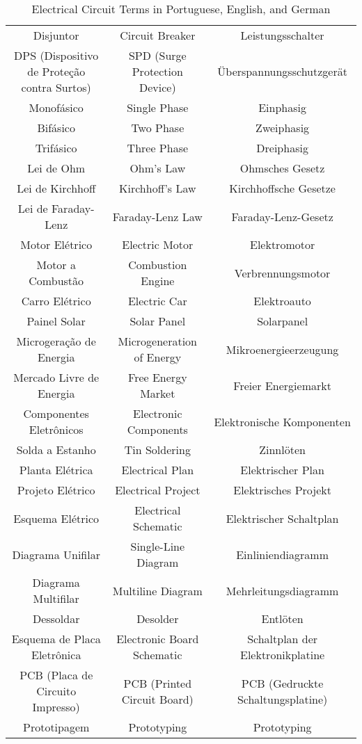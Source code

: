 \begin{table}[ht]
\begin{tabular}{|c|c|c|}
  Disjuntor & Circuit Breaker & Leistungsschalter \\
  DPS (Dispositivo de Proteção contra Surtos) & SPD (Surge Protection Device) & Überspannungsschutzgerät \\
  Monofásico & Single Phase & Einphasig \\
  Bifásico & Two Phase & Zweiphasig \\
  Trifásico & Three Phase & Dreiphasig \\
  Lei de Ohm & Ohm's Law & Ohmsches Gesetz \\
  Lei de Kirchhoff & Kirchhoff's Law & Kirchhoffsche Gesetze \\
  Lei de Faraday-Lenz & Faraday-Lenz Law & Faraday-Lenz-Gesetz \\
  Motor Elétrico & Electric Motor & Elektromotor \\
  Motor a Combustão & Combustion Engine & Verbrennungsmotor \\
  Carro Elétrico & Electric Car & Elektroauto \\
  Painel Solar & Solar Panel & Solarpanel \\
  Microgeração de Energia & Microgeneration of Energy & Mikroenergieerzeugung \\
  Mercado Livre de Energia & Free Energy Market & Freier Energiemarkt \\
  Componentes Eletrônicos & Electronic Components & Elektronische Komponenten \\
  Solda a Estanho & Tin Soldering & Zinnlöten \\
  Planta Elétrica & Electrical Plan & Elektrischer Plan \\
  Projeto Elétrico & Electrical Project & Elektrisches Projekt \\
  Esquema Elétrico & Electrical Schematic & Elektrischer Schaltplan \\
  Diagrama Unifilar & Single-Line Diagram & Einliniendiagramm \\
  Diagrama Multifilar & Multiline Diagram & Mehrleitungsdiagramm \\
  Dessoldar & Desolder & Entlöten \\
  Esquema de Placa Eletrônica & Electronic Board Schematic & Schaltplan der Elektronikplatine \\
  PCB (Placa de Circuito Impresso) & PCB (Printed Circuit Board) & PCB (Gedruckte Schaltungsplatine) \\
  Prototipagem & Prototyping & Prototyping 
  \hline
  \end{tabular}
  \caption{Electrical Circuit Terms in Portuguese, English, and German}
  \label{table:electrical_terms}
  \end{table}

